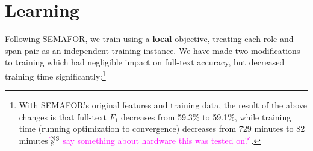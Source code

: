 \documentclass[11pt,a4paper]{article}
\newcommand{\ensuretext}[1]{#1}
\newcommand{\nssmarker}{\ensuretext{\textcolor{magenta}{\ensuremath{^{\textsc{NS}}_{\textsc{S}}}}}}
\newcommand{\mkmarker}{\ensuretext{\textcolor{red}{\ensuremath{^{\textsc{M}}_{\textsc{K}}}}}}
\newcommand{\stmarker}{\ensuretext{\textcolor{orange}{\ensuremath{^{\textsc{S}}_{\textsc{T}}}}}}
\newcommand{\arkcomment}[3]{\ensuretext{\textcolor{#3}{[#1 #2]}}}
\newcommand{\nss}[1]{\arkcomment{\nssmarker}{#1}{magenta}}
\newcommand{\mk}[1]{\arkcomment{\mkmarker}{#1}{red}}
\newcommand{\st}[1]{\arkcomment{\stmarker}{#1}{orange}}
\newcommand{\term}[1]{\textbf{#1}} %
\begin{document}
\section{Learning}
\label{sec:learning}


Following SEMAFOR, we train using a \term{local} objective,
treating each role and span pair as an independent training instance.
We have made two modifications to training which had negligible impact on
full-text accuracy, but decreased training time significantly:\footnote{With
SEMAFOR's original features and training data, the result of the above changes is that full-text $F_1$ decreases from 59.3\% to 59.1\%, 
while training time (running optimization to convergence) 
decreases from 729 minutes to 82 minutes\nss{say something about hardware this was tested on?}.%
} 
\end{document}
